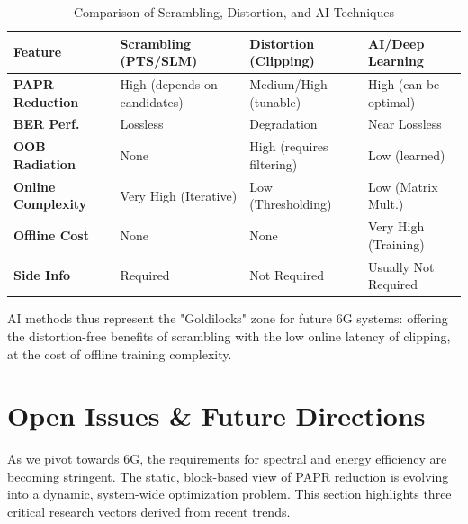 \documentclass[conference]{IEEEtran}
\begin{document}
\begin{table}[htbp]
    \caption{Comparison of Scrambling, Distortion, and AI Techniques}
    \begin{center}
        \begin{tabular}{|l|p{2cm}|p{2cm}|p{2cm}|}
            \hline
            \textbf{Feature}           & \textbf{Scrambling (PTS/SLM)} & \textbf{Distortion (Clipping)} & \textbf{AI/Deep Learning} \\ \hline
            \textbf{PAPR Reduction}    & High (depends on candidates)  & Medium/High (tunable)          & High (can be optimal)     \\ \hline
            \textbf{BER Perf.}         & Lossless                      & Degradation                    & Near Lossless             \\ \hline
            \textbf{OOB Radiation}     & None                          & High (requires filtering)      & Low (learned)             \\ \hline
            \textbf{Online Complexity} & Very High (Iterative)         & Low (Thresholding)             & Low (Matrix Mult.)        \\ \hline
            \textbf{Offline Cost}      & None                          & None                           & Very High (Training)      \\ \hline
            \textbf{Side Info}         & Required                      & Not Required                   & Usually Not Required      \\ \hline
        \end{tabular}
        \label{tab2}
    \end{center}
\end{table}

AI methods thus represent the "Goldilocks" zone for future 6G systems: offering the distortion-free benefits of scrambling with the low online latency of clipping, at the cost of offline training complexity.

\section{Open Issues \& Future Directions}

As we pivot towards 6G, the requirements for spectral and energy efficiency are becoming stringent. The static, block-based view of PAPR reduction is evolving into a dynamic, system-wide optimization problem. This section highlights three critical research vectors derived from recent trends.
\end{document}
